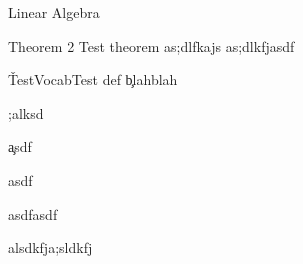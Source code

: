 \documentclass[10pt]{article}
\begin{document}
Linear Algebra


\begin{theorem}{Theorem 2}
Test theorem
as;dlfkajs
as;dlkfjasdf
\end{theorem}
\v{TestVocab}{Test def}
\c blahblah \;

\eg ;alksd \;


\c asdf \;

asdf



asdfasdf



alsdkfja;sldkfj
\end{document}
